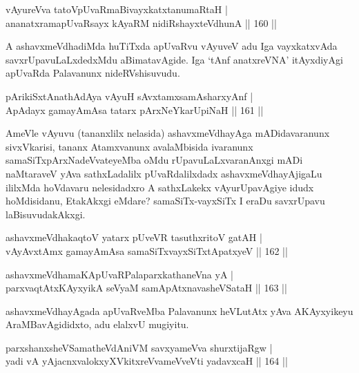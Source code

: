 
\begin{shl}
vAyureVva tatoV\s pUvaRmaBivayxkatxtanumaRtaH |\\
ananatxramapUvaRsayx kAyaRM nidiRshayxteV\s dhunA \hfill || 160 ||
\end{shl}

\begin{artha}
A ashavxmeVdhadiMda huTiTxda apUvaRvu vAyuveV adu Iga vayxkatxvAda savxrUpavuLaLxdedxMdu aBimatavAgide. Iga `tAnf anatxreVNA' itAyxdiyAgi apUvaRda Palavanunx nideRVshisuvudu.
\end{artha}

\begin{shl}
pArikiSxtAnathA\s \s dAya vAyuH sAvxtamxsamAsharxyAnf |\\
ApAdayx gamayAmAsa tatarx pArxNeYkarUpiNaH \hfill || 161 ||
\end{shl}

\begin{artha}
AmeVle vAyuvu (tananxlilx nelasida) ashavxmeVdhayAga mADidavaranunx sivxVkarisi, tananx Atamxvanunx avalaMbisida ivaranunx samaSiTxpArxNadeVvateyeMba oMdu rUpavuLaLxvaranAnxgi mADi naMtaraveV yAva sathxLadalilx pUvaRdalilxdadx ashavxmeVdhayAjigaLu ililxMda hoVdavaru nelesidadxro A sathxLakekx vAyurUpavAgiye idudx hoMdisidanu, EtakAkxgi eMdare? samaSiTx-vayxSiTx I eraDu savxrUpavu laBisuvudakAkxgi.
\end{artha}

\begin{shl}
ashavxmeVdhakaqtoV yatarx pUveVR tasuthxritoV gatAH |\\
vAyAvxtAmx gamayAmAsa samaSiTxvayxSiTxtApatxyeV \hfill || 162 ||
\end{shl}

\begin{shl}
ashavxmeVdhamaKApUvaRPalaparxkathaneVna yA |\\
parxvaqtAtx\s \s KAyxyikA seVyaM samApAtx\s navasheVSataH \hfill || 163 ||
\end{shl}

\begin{artha}
ashavxmeVdhayAgada apUvaRveMba Palavanunx heVLutAtx yAva AKAyxyikeyu AraMBavAgididxto, adu elalxvU mugiyitu.
\end{artha}

\begin{shl}
parxshanxsheVSamatheVdAniVM savxyameVva shurxtijaRgw |\\
yadi vA yAjacnxvalokxyXVkitxreVvameVveVti yadavxcaH \hfill || 164 ||
\end{shl}

